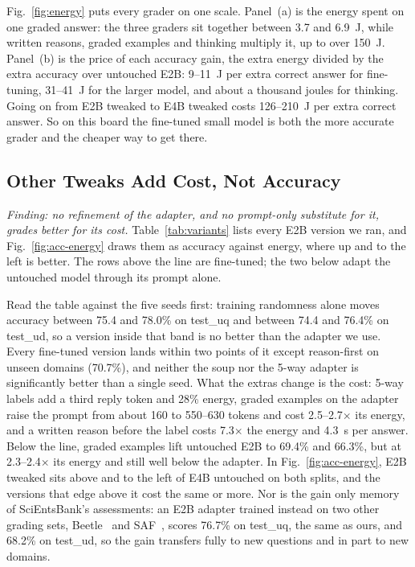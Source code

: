 \documentclass[journal]{IEEEtran}
\begin{document}
Fig.~\ref{fig:energy} puts every grader on one scale.
Panel~(a) is the energy spent on one graded answer: the three graders sit together between 3.7 and 6.9~J, while written reasons, graded examples and thinking multiply it, up to over 150~J.
Panel~(b) is the price of each accuracy gain, the extra energy divided by the extra accuracy over untouched E2B: 9--11~J per extra correct answer for fine-tuning, 31--41~J for the larger model, and about a thousand joules for thinking.
Going on from E2B tweaked to E4B tweaked costs 126--210~J per extra correct answer.
So on this board the fine-tuned small model is both the more accurate grader and the cheaper way to get there.


\subsection{Other Tweaks Add Cost, Not Accuracy}
\label{sec:r-tweaks}
\textit{Finding: no refinement of the adapter, and no prompt-only substitute for it, grades better for its cost.}
Table~\ref{tab:variants} lists every E2B version we ran, and Fig.~\ref{fig:acc-energy} draws them as accuracy against energy, where up and to the left is better.
The rows above the line are fine-tuned; the two below adapt the untouched model through its prompt alone.

Read the table against the five seeds first: training randomness alone moves accuracy between 75.4 and 78.0\% on test\_uq and between 74.4 and 76.4\% on test\_ud, so a version inside that band is no better than the adapter we use.
Every fine-tuned version lands within two points of it except reason-first on unseen domains (70.7\%), and neither the soup nor the 5-way adapter is significantly better than a single seed.
What the extras change is the cost: 5-way labels add a third reply token and 28\% energy, graded examples on the adapter raise the prompt from about 160 to 550--630 tokens and cost 2.5--2.7$\times$ its energy, and a written reason before the label costs 7.3$\times$ the energy and 4.3~s per answer.
Below the line, graded examples lift untouched E2B to 69.4\% and 66.3\%, but at 2.3--2.4$\times$ its energy and still well below the adapter.
In Fig.~\ref{fig:acc-energy}, E2B tweaked sits above and to the left of E4B untouched on both splits, and the versions that edge above it cost the same or more.
Nor is the gain only memory of SciEntsBank's assessments: an E2B adapter trained instead on two other grading sets, Beetle~\cite{dzikovska2013semeval} and SAF~\cite{filighera2022saf}, scores 76.7\% on test\_uq, the same as ours, and 68.2\% on test\_ud, so the gain transfers fully to new questions and in part to new domains.
\end{document}
